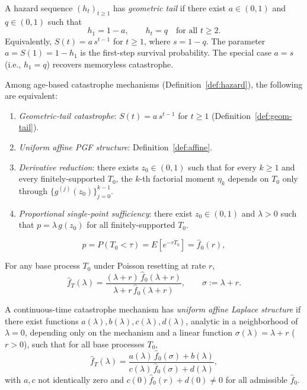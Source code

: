 \documentclass[10pt,a4paper]{amsart}
\begin{document}
\begin{definition}\label{def:geom-tail}
A hazard sequence $(h_t)_{t \geq 1}$ has \emph{geometric tail} if there exist $a \in (0,1)$ and $q \in (0,1)$ such that
\[
  h_1 = 1-a, \qquad h_t = q \quad \text{for all } t \geq 2.
\]
Equivalently, $S(t) = a\,s^{t-1}$ for $t \geq 1$, where $s = 1-q$.  The parameter $a = S(1) = 1-h_1$ is the first-step survival probability.  The special case $a = s$ (i.e., $h_1 = q$) recovers memoryless catastrophe.
\end{definition}

\begin{theorem}[Characterization]\label{thm:char}
Among age-based catastrophe mechanisms (Definition~\ref{def:hazard}), the following are equivalent:
\begin{enumerate}[\rm (A)]
  \item \emph{Geometric-tail catastrophe}: $S(t) = a\,s^{t-1}$ for $t \geq 1$ (Definition~\ref{def:geom-tail}).
  \item \emph{Uniform affine PGF structure}: Definition~\ref{def:affine}.
  \item \emph{Derivative reduction}: there exists $z_0 \in (0,1)$ such that for every $k \geq 1$ and every finitely-supported $T_0$, the $k$-th factorial moment $\eta_k$ depends on $T_0$ only through $\{g^{(j)}(z_0)\}_{j=0}^{k-1}$.
  \item \emph{Proportional single-point sufficiency}: there exist $z_0 \in (0,1)$ and $\lambda > 0$ such that $p = \lambda\,g(z_0)$ for all finitely-supported $T_0$.
\end{enumerate}
\end{theorem}

\begin{equation}\label{eq:p-ct}
  p = P(T_0 < \tau) = E[e^{-rT_0}] = \hat{f}_0(r),
\end{equation}

\begin{theorem}\label{thm:ct-pgf}
For any base process $T_0$ under Poisson resetting at rate $r$,
\begin{equation}\label{eq:ct-lt}
  \hat{f}_T(\lambda) = \frac{(\lambda + r)\,\hat{f}_0(\lambda + r)}{\lambda + r\,\hat{f}_0(\lambda + r)}, \qquad \sigma := \lambda + r.
\end{equation}
\end{theorem}

\begin{definition}\label{def:ct-affine}
A continuous-time catastrophe mechanism has \emph{uniform affine Laplace structure} if there exist functions \(a(\lambda),b(\lambda),c(\lambda),d(\lambda)\), analytic in a neighborhood of \(\lambda=0\), depending only on the mechanism and a linear function $\sigma(\lambda) = \lambda + r$ ($r > 0$), such that for all base processes $T_0$,
\[
  \hat{f}_T(\lambda) = \frac{a(\lambda)\,\hat{f}_0(\sigma) + b(\lambda)}{c(\lambda)\,\hat{f}_0(\sigma) + d(\lambda)},
\]
with $a, c$ not identically zero and $c(0)\hat{f}_0(r) + d(0) \neq 0$ for all admissible $\hat{f}_0$.
\end{definition}
\end{document}
